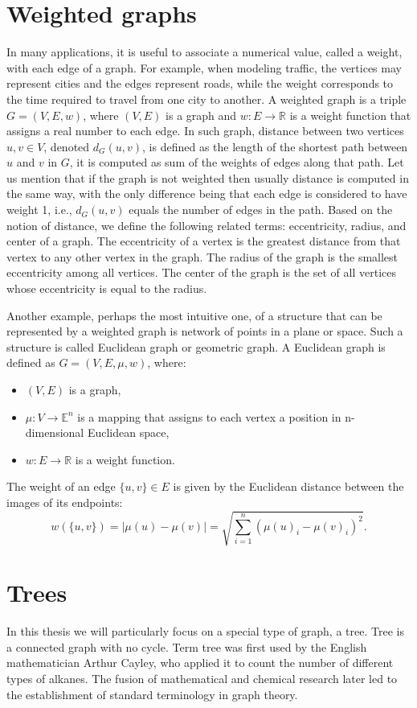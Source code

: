 \documentclass[openany]{book}
\begin{document}
	\section{Weighted graphs}	
	In many applications, it is useful to associate a numerical value, called a weight, with each edge of a graph. For example, when modeling traffic, the vertices may represent cities and the edges represent roads, while the weight corresponds to the time required to travel from one city to another. 
	A weighted graph is a triple \( G = (V, E, w) \), where \( (V, E) \) is a graph and \( w : E \to \mathbb{R} \) is a weight function that assigns a real number to each edge. 
	In such graph, distance between two vertices \( u, v \in V \), denoted \( d_G(u,v) \),  is defined as the length of the shortest path between \( u \) and \( v \) in \( G \), it is computed as sum of the weights of edges along that path. Let us mention that if the graph is not weighted then usually distance is computed in the same way, with the only difference being that each edge is considered to have weight 1, i.e., \( d_G(u,v) \) equals the number of edges in the path.
	Based on the notion of distance, we define the following related terms: eccentricity, radius, and center of a graph. The eccentricity of a vertex is the greatest distance from that vertex to any other vertex in the graph. The radius of the graph is the smallest eccentricity among all vertices. The center of the graph is the set of all vertices whose eccentricity is equal to the radius.
	
	Another example, perhaps the most intuitive one, of a structure that can be represented by a weighted graph is network of points in a plane or space. Such a structure is called Euclidean graph or geometric graph.
	A Euclidean graph is defined as \( G = (V, E, \mu, w) \), where:
	\begin{itemize}
		\item \( (V, E) \) is a graph,
		\item \( \mu : V \to \mathbb{E}^n \) is a mapping that assigns to each vertex a position in n-dimensional Euclidean space,
		\item \( w : E \to \mathbb{R} \) is a weight function.
	\end{itemize}
	The weight of an edge \( \{u,v\} \in E \) is given by the Euclidean distance between the images of its endpoints:
	\[
	w(\{u,v\}) = |\mu(u) - \mu(v)| = \sqrt{ \sum_{i=1}^{n} (\mu(u)_i - \mu(v)_i)^2 }.
	\]
	
	\section{Trees}
	In this thesis we will particularly focus on a special type of graph, a tree.
	Tree is a connected graph with no cycle.
	Term tree was first used by the English mathematician Arthur Cayley, who applied it to count the number of different types of alkanes. The fusion of mathematical and chemical research later led to the establishment of standard terminology in graph theory.
	
\end{document}
